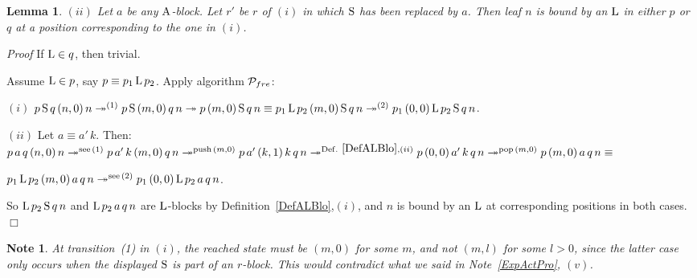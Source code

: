 \documentclass{article}
\theoremstyle{plain}
\newtheorem{Lem}[The]{Lemma}
\newtheorem{Note}[The]{Note}
\theoremstyle{definition}
\begin{document}
{\begin{Lem}
$(ii)$ Let $a$ be any ${{\rm A}}$-block. Let $r'$ be $r$ of $(i)$ in which ${\rm S}$ has been replaced by $a$. Then leaf $n$ is bound by an ${\rm L}$ in either $p$ or $q$ at a position corresponding to the one in $(i)$.
\end{Lem}

{\it Proof\/} If ${\rm L} \in q$, then trivial.

Assume ${\rm L} \in p$, say $p \equiv p_1 \, {\rm L} \, p_2$. Apply algorithm ${{\cal P}_{fre}}$:

$(i)$ $p \, {\rm S} \, q \, (n,0) \, n \twoheadrightarrow^{(1)} p \, {\rm S} \, (m,0) \, q \, n \twoheadrightarrow p \, (m,0) \, {\rm S} \, q \, n \equiv p_1 \, {\rm L} \, p_2 \, (m,0) \, {\rm S} \, q \, n \twoheadrightarrow^{(2)} p_1 \, (0,0) \, {\rm L} \, p_2 \, {\rm S} \, q \, n$.

$(ii)$ Let $a \equiv a' \, k$. Then: $p \, a \, q \, (n,0) \, n \twoheadrightarrow^{{\rm see\,}(1)} p \, a' \, k \, (m,0) \, q \, n \twoheadrightarrow^{{\rm push}\, (m,0)} p \, a' \, (k,1) \, k \, q \, n \twoheadrightarrow^{{\rm Def. ~\ref{DefALBlo}},(ii)} p \, (0,0) \, a' \, k \, q \, n \twoheadrightarrow^{{\rm pop}\,(m,0)} p \, (m,0) \, a \, q \, n \equiv$

\noindent $p_1 \, {\rm L} \, p_2 \, (m,0) \, a \, q \, n \twoheadrightarrow^{{\rm see\,}(2)} p_1 \, (0,0) \, {\rm L} \, p_2 \, a \, q \, n$.

So ${\rm L} \, p_2 \, {\rm S} \, q \, n$ and  ${\rm L} \, p_2 \, a \, q \, n$ are ${{\rm L}}$-blocks by Definition~\ref{DefALBlo},$(i)$, and $n$ is bound by an ${\rm L}$ at corresponding positions in both cases. $\Box$

\begin{Note}\label{NotThe} At transition~{\rm (1)} in $(i)$, the reached state must be $(m,0)$ for some $m$, and not $(m,l)$ for some $l > 0$, since the latter case only occurs when the displayed ${\rm S}$ is part of an $r$-block. This would contradict what we said in Note~\ref{ExpActPro}, $(v)$.




\end{Note}



}
\end{document}
